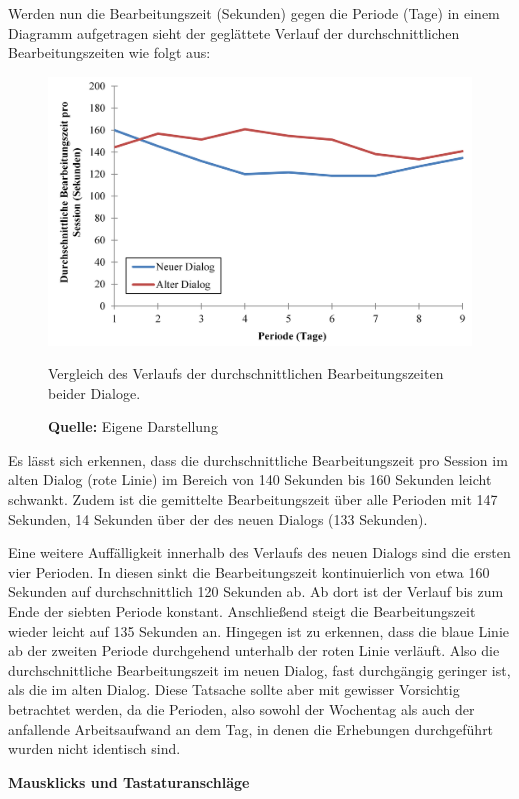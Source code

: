 Werden nun die Bearbeitungszeit (Sekunden) gegen die Periode (Tage) in einem Diagramm aufgetragen sieht der geglättete Verlauf der durchschnittlichen Bearbeitungszeiten wie folgt aus:
\begin{figure}[H]
  \centering
  \includegraphics[]{img/Bearbeitungszeit_Verlauf.png}
  \caption{Vergleich des Verlaufs der durchschnittlichen Bearbeitungszeiten beider Dialoge.}
  \caption*{\textbf{Quelle:} Eigene Darstellung}
  \label{fig:BearbeitungszeitVerlauf}
\end{figure}
Es lässt sich erkennen, dass die durchschnittliche Bearbeitungszeit pro Session im alten Dialog (rote Linie) im Bereich von 140 Sekunden bis 160 Sekunden leicht schwankt. Zudem ist die gemittelte Bearbeitungszeit über alle Perioden mit 147 Sekunden, 14 Sekunden über der des neuen Dialogs (133 Sekunden).

Eine weitere Auffälligkeit innerhalb des Verlaufs des neuen Dialogs sind die ersten vier Perioden. In diesen sinkt die Bearbeitungszeit kontinuierlich von etwa 160 Sekunden auf durchschnittlich 120 Sekunden ab. Ab dort ist der Verlauf bis zum Ende der siebten Periode konstant. Anschließend steigt die Bearbeitungszeit wieder leicht auf 135 Sekunden an. Hingegen ist zu erkennen, dass die blaue Linie ab der zweiten Periode durchgehend unterhalb der roten Linie verläuft. Also die durchschnittliche Bearbeitungszeit im neuen Dialog, fast durchgängig geringer ist, als die im alten Dialog. Diese Tatsache sollte aber mit gewisser Vorsichtig betrachtet werden, da die Perioden, also sowohl der Wochentag als auch der anfallende Arbeitsaufwand an dem Tag, in denen die Erhebungen durchgeführt wurden nicht identisch sind.

\pagebreak
\textbf{Mausklicks und Tastaturanschläge}

